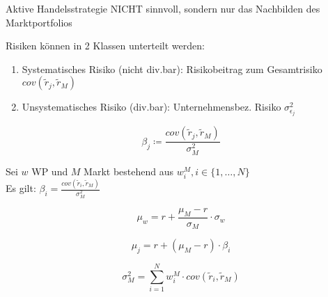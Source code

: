\begin{der}
	Aktive Handelsstrategie NICHT sinnvoll, sondern nur das Nachbilden des Marktportfolios    
\end{der}

\begin{ann}[Risiko]
	Risiken können in 2 Klassen unterteilt werden:\\
	\begin{enumerate}
		\item Systematisches Risiko (nicht div.bar): Risikobeitrag zum Gesamtrisiko $cov(\tilde{r}_j, \tilde{r}_M)$
		\item Unsystematisches Risiko (div.bar): Unternehmensbez. Risiko $\sigma^{2}_{\epsilon_j}$
	\end{enumerate}    
\end{ann}

\begin{defi}[$\beta_j$]
	$$\beta_j \coloneqq \frac{cov(\tilde{r}_j, \tilde{r}_M)}{\sigma^{2}_M}$$
\end{defi}

Sei $w$ WP und $M$ Markt bestehend aus $w^M_i, i \in \{1, \dots, N\}$\\
Es gilt: $\beta_i = \frac{cov(\tilde{r}_i, \tilde{r}_M)}{\sigma^{2}_M}$
\begin{formula}[KML]
	$$\mu_w = r + \frac{\mu_M - r}{\sigma_M} \cdot \sigma_w$$
\end{formula}
\begin{formula}[WPML]
	$$\mu_j = r + (\mu_M - r) \cdot \beta_i$$
\end{formula}
\begin{formula}
	$$\sigma^{2}_M = \sum_{i=1}^{N}w_i^M \cdot cov(\tilde{r}_i, \tilde{r}_M)$$
\end{formula}


